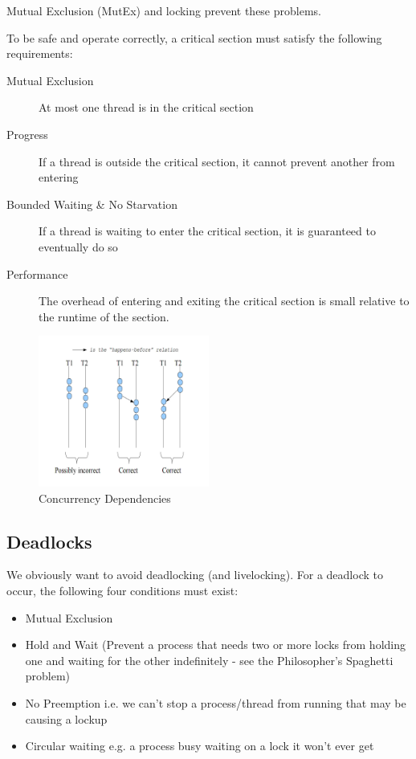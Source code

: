 \documentclass[a4]{article}
\begin{document}
Mutual Exclusion (MutEx) and locking prevent these problems.

To be safe and operate correctly, a critical section must satisfy the
following requirements:

\begin{description}
\item[Mutual Exclusion]
At most one thread is in the critical section
\item[Progress]
If a thread is outside the critical section, it cannot prevent another
from entering
\item[Bounded Waiting \& No Starvation]
If a thread is waiting to enter the critical section, it is guaranteed
to eventually do so
\item[Performance]
The overhead of entering and exiting the critical section is small
relative to the runtime of the section.
\end{description}

\begin{figure}[h!]
  \centering
  \includegraphics[width=0.5\textwidth]{correctConcurrency}
  \caption{Concurrency Dependencies}
\end{figure}


\subsection{Deadlocks}

We obviously want to avoid deadlocking (and livelocking). For a deadlock to occur, the following four conditions must exist:

\begin{itemize}
\item Mutual Exclusion
\item Hold and Wait (Prevent a process that needs two or more locks from holding one and waiting for the other indefinitely - see the Philosopher's Spaghetti problem)
\item No Preemption i.e. we can't stop a process/thread from running that may be causing a lockup
\item Circular waiting e.g. a process busy waiting on a lock it won't ever get
\end{itemize}
\end{document}
